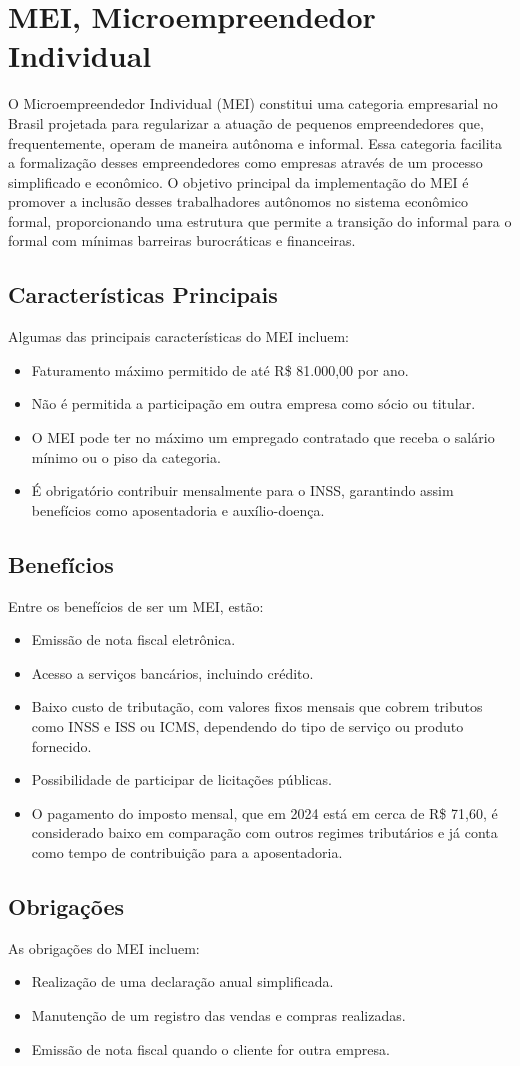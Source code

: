 \section{MEI, Microempreendedor Individual}

O Microempreendedor Individual (MEI) constitui uma categoria empresarial no Brasil projetada para regularizar a atuação de pequenos empreendedores que, frequentemente, operam de maneira autônoma e informal. Essa categoria facilita a formalização desses empreendedores como empresas através de um processo simplificado e econômico. O objetivo principal da implementação do MEI é promover a inclusão desses trabalhadores autônomos no sistema econômico formal, proporcionando uma estrutura que permite a transição do informal para o formal com mínimas barreiras burocráticas e financeiras.

\subsection{Características Principais}

Algumas das principais características do MEI incluem:
\begin{itemize}
    \item Faturamento máximo permitido de até R\$ 81.000,00 por ano.
    \item Não é permitida a participação em outra empresa como sócio ou titular.
    \item O MEI pode ter no máximo um empregado contratado que receba o salário mínimo ou o piso da categoria.
    \item É obrigatório contribuir mensalmente para o INSS, garantindo assim benefícios como aposentadoria e auxílio-doença.
\end{itemize}

\subsection{Benefícios}

Entre os benefícios de ser um MEI, estão:
\begin{itemize}
    \item Emissão de nota fiscal eletrônica.
    \item Acesso a serviços bancários, incluindo crédito.
    \item Baixo custo de tributação, com valores fixos mensais que cobrem tributos como INSS e ISS ou ICMS, dependendo do tipo de serviço ou produto fornecido.
    \item Possibilidade de participar de licitações públicas.
    \item O pagamento do imposto mensal, que em 2024 está em cerca de R\$ 71,60, é considerado baixo em comparação com outros regimes tributários e já conta como tempo de contribuição para a aposentadoria.
\end{itemize}

\subsection{Obrigações}

As obrigações do MEI incluem:
\begin{itemize}
    \item Realização de uma declaração anual simplificada.
    \item Manutenção de um registro das vendas e compras realizadas.
    \item Emissão de nota fiscal quando o cliente for outra empresa.
\end{itemize}
